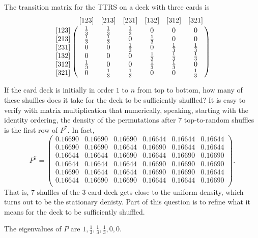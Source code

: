 \documentclass[12pt]{article}
\begin{document}
\begin{example}
The transition matrix for the TTRS on a deck with three cards is
\[
    \bordermatrix{
        & [123] & [213] & [231] & [132] & [312] & [321] \cr
        [123]   & \frac{1}{3}   & \frac{1}{3}   & \frac{1}{3}   & 0
        & 0     & 0 \cr
        [213]   & \frac{1}{3}   & \frac{1}{3}   & 0     & \frac{1}{3}
        & 0     & 0 \cr
        [231]   & 0     & 0     & \frac{1}{3}   & 0     & \frac{1}{3}
        & \frac{1}{3} \cr
        [132]   & 0     & 0     & 0     & \frac{1}{3}   & \frac{1}{3}
        & \frac{1}{3} \cr
        [312]   & \frac{1}{3}   & 0     & 0     & \frac{1}{3}   & \frac{1}
        {3}     & 0 \cr
        [321]   & 0     & \frac{1}{3}   & \frac{1}{3}   & 0     & 0
        & \frac{1}{3} \cr
    }
\]

If the card deck is initially in order \( 1 \) to \( n \) from top to
bottom, how many of these shuffles does it take for the deck to be
sufficiently shuffled? It is easy to verify with matrix multiplication
that numerically, speaking, starting with the identity ordering, the
density of the permutations after \( 7 \) top-to-random shuffles is the
first row of \( P^7 \).  In fact,
\[
    P^7 =
    \begin{pmatrix}
      0.16690 & 0.16690 & 0.16690 & 0.16644 & 0.16644 & 0.16644 \\
      0.16690 & 0.16690 & 0.16644 & 0.16690 & 0.16644 & 0.16644 \\
      0.16644 & 0.16644 & 0.16690 & 0.16644 & 0.16690 & 0.16690 \\
      0.16644 & 0.16644 & 0.16644 & 0.16690 & 0.16690 & 0.16690 \\
      0.16690 & 0.16644 & 0.16644 & 0.16690 & 0.16690 & 0.16644 \\
      0.16644 & 0.16690 & 0.16690 & 0.16644 & 0.16644 & 0.16690 \\
    \end{pmatrix}
    .
\] That is, \( 7 \) shuffles of the 3-card deck gets close to the
uniform density, which turns out to be the stationary denisty. Part of
this question is to refine what it means for the deck to be sufficiently
shuffled.

The eigenvalues of \( P \)  are \( 1, \frac{1}{3}, \frac{1}{3}, \frac
{1}{3}, 0, 0 \).

\end{example}
\end{document}
